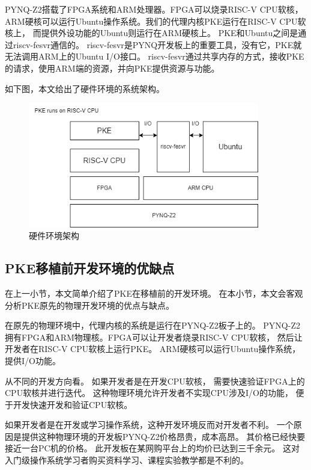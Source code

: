 PYNQ-Z2搭载了FPGA系统和ARM处理器。\cite{2019Research}FPGA可以烧录RISC-V CPU软核，
ARM硬核可以运行Ubuntu操作系统。我们的代理内核PKE运行在RISC-V CPU软核上，
而提供外设功能的Ubuntu则运行在ARM硬核上。
PKE和Ubuntu之间是通过riscv-fesvr通信的。
riscv-fesvr是PYNQ开发板上的重要工具，没有它，PKE就无法调用ARM上的Ubuntu I/O接口。
riscv-fesvr通过共享内存的方式，接收PKE的请求，使用ARM端的资源，并向PKE提供资源与功能。

如下图，本文给出了硬件环境的系统架构。

\begin{figure}[htbp]
    \vspace{13pt} %
    \centering
    \includegraphics[width=0.9\textwidth]{images/pke_hardware_env.drawio.png}
    \caption{硬件环境架构}\label{硬件环境架构} %
\end{figure}

\subsection{PKE移植前开发环境的优缺点}

在上一小节，本文简单介绍了PKE在移植前的开发环境。
在本小节，本文会客观分析PKE原先的物理开发环境的优点与缺点。

在原先的物理环境中，代理内核的系统是运行在PYNQ-Z2板子上的。
PYNQ-Z2拥有FPGA和ARM物理核。FPGA可以让开发者烧录RISC-V CPU软核，
然后让开发者在RISC-V CPU软核上运行PKE。
ARM硬核可以运行Ubuntu操作系统，提供I/O功能。\cite{1996Computer}

从不同的开发方向看。
如果开发者是在开发CPU软核，
需要快速验证FPGA上的CPU软核并进行迭代。
这种物理环境允许开发者不实现CPU涉及I/O的功能，
便于开发快速开发和验证CPU软核。

如果开发者是在开发或学习操作系统，这种开发环境反而对开发者不利。
一个原因是提供这种物理环境的开发板PYNQ-Z2价格昂贵，成本高昂。
其价格已经快要接近一台PC机的价格。
此开发板在某网购平台上的均价已达到三千余元。
这对入门级操作系统学习者购买资料学习、课程实验教学都是不利的。

